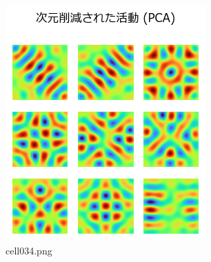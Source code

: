\begin{figure}[ht]
	\centering
	\includegraphics[scale=0.8, max width=\linewidth]{./fig/local-learning-rule/pca-hebbian-learning/cell034.png}
	\caption{cell034.png}
	\label{cell034.png}
\end{figure}